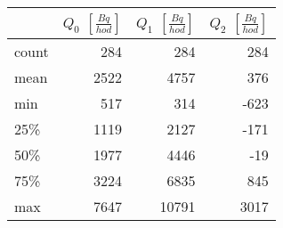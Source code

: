 \begin{tabular}{lrrr}
\toprule
{} &  $Q_0$ $\left[\si{\frac{Bq}{hod}}\right]$ &  $Q_1$ $\left[\si{\frac{Bq}{hod}}\right]$ &  $Q_2$ $\left[\si{\frac{Bq}{hod}}\right]$ \\
\midrule
count &                                       284 &                                       284 &                                       284 \\
mean  &                                      2522 &                                      4757 &                                       376 \\
min   &                                       517 &                                       314 &                                      -623 \\
25\%   &                                      1119 &                                      2127 &                                      -171 \\
50\%   &                                      1977 &                                      4446 &                                       -19 \\
75\%   &                                      3224 &                                      6835 &                                       845 \\
max   &                                      7647 &                                     10791 &                                      3017 \\
\bottomrule
\end{tabular}

